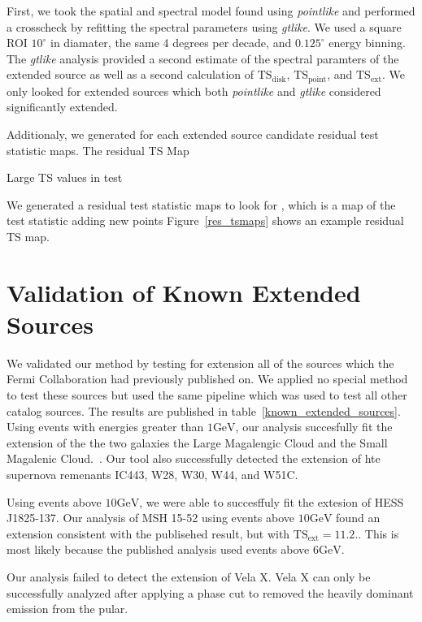 \documentclass[preprint]{aastex}
\newcommand{\gev}{\text{GeV}\xspace}
\newcommand{\tsext}{\ensuremath{\text{TS}_\text{ext}}\xspace}
\newcommand{\ts}{\text{TS}\xspace}
\newcommand{\pointlike}{{\em pointlike}\xspace}
\newcommand{\gtlike}{{\em gtlike}\xspace}
\begin{document}
First, we took the spatial and spectral model found using \pointlike
and performed a crosscheck by refitting the spectral parameters using 
\gtlike.
We used a square ROI $10^\circ$ in diamater, the same 4 degrees
per decade, and $0.125^\circ$ energy binning.
The \gtlike analysis provided a second estimate of the spectral
paramters of the extended source as well as a second calculation of
$\ts_\text{disk}$, $\ts_\text{point}$, and 
$\tsext$. We only looked for extended sources which 
both \pointlike and \gtlike considered significantly extended.

Additionaly, we generated for each 
extended source candidate residual test statistic maps. 
The residual TS Map

Large
TS values in test 


We generated a residual test statistic maps to look for
, which is a map of the test
statistic adding new points
Figure~\ref{res_tsmaps} shows an example residual TS map.






\section{Validation of Known Extended Sources}
\label{validate_known}

We validated our method by testing for extension all of the sources
which the Fermi Collaboration had previously published on.  We applied
no special method to test these sources but used the same pipeline which
was used to test all other catalog sources.  The results are published
in table~\ref{known_extended_sources}.  Using events with energies
greater than $1\gev$, our analysis succesfully fit the extension of the
the two galaxies the Large Magalengic Cloud and the Small Magalenic
Cloud.~\cite{SMC & LMC Paper}.  Our tool also successfully detected the
extension of hte supernova remenants IC443, W28, W30, W44, and W51C.

Using events above $10\gev$, we were able to succesffuly fit the extesion
of HESS J1825-137\cite{HESS 1825 paper}. Our analysis of MSH 15-52 using
events above $10\gev$ found an extension consistent with the publisehed
result, but with $\tsext=11.2$.\cite{MSH 15-52 Paper}. This
is most likely because the published analysis used events above $6\gev$.

Our analysis failed to detect the extension of Vela X. Vela X can only be
successfully analyzed after applying a phase cut to removed the heavily
dominant emission from the pular.
\end{document}

